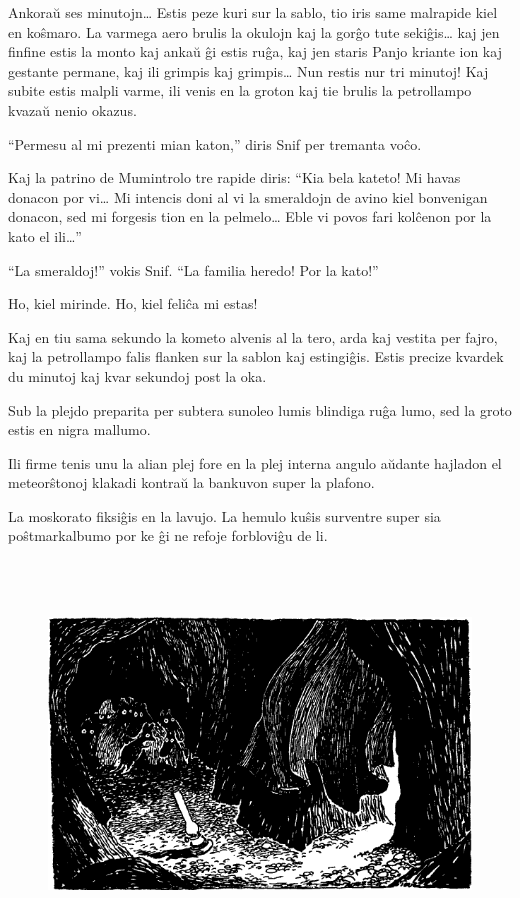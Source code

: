 Ankoraŭ ses minutojn{\ldots} Estis peze kuri sur la sablo, tio iris same malrapide kiel en koŝmaro. La varmega aero brulis la okulojn kaj la gorĝo tute sekiĝis{\ldots} kaj jen finfine estis la monto kaj ankaŭ ĝi estis ruĝa, kaj jen staris Panjo kriante ion kaj gestante permane, kaj ili grimpis kaj grimpis{\ldots} Nun restis nur tri minutoj! Kaj subite estis malpli varme, ili venis en la groton kaj tie brulis la petrollampo kvazaŭ nenio okazus.

``Permesu al mi prezenti mian katon,'' diris Snif per tremanta voĉo.

Kaj la patrino de Mumintrolo tre rapide diris: ``Kia bela kateto! Mi havas donacon por vi{\ldots} Mi intencis doni al vi la smeraldojn de avino kiel bonvenigan donacon, sed mi forgesis tion en la pelmelo{\ldots} Eble vi povos fari kolĉenon por la kato el ili{\ldots}''

``La smeraldoj!'' vokis Snif. ``La familia heredo! Por la kato!''

Ho, kiel mirinde. Ho, kiel feliĉa mi estas!

Kaj en tiu sama sekundo la kometo alvenis al la tero, arda kaj vestita per fajro, kaj la petrollampo falis flanken sur la sablon kaj estingiĝis. Estis precize kvardek du minutoj kaj kvar sekundoj post la oka.

Sub la plejdo preparita per subtera sunoleo lumis blindiga ruĝa lumo, sed la groto estis en nigra mallumo.

Ili firme tenis unu la alian plej fore en la plej interna angulo aŭdante hajladon el meteorŝtonoj klakadi kontraŭ la bankuvon super la plafono.

La moskorato fiksiĝis en la lavujo. La hemulo kuŝis surventre super sia poŝtmarkalbumo por ke ĝi ne refoje forbloviĝu de li.

\begin{figure}[htbp]
\centering
\includegraphics[width=450pt,height=290pt]{9-11.png}
\caption{}
\label{9-11}
\end{figure}

